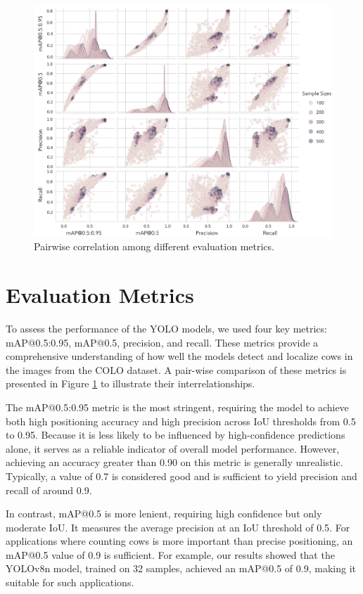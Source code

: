 \begin{figure}[h]
    \centering
    \includegraphics[width=1\textwidth]{figure_s1.jpg}
    \caption{Pairwise correlation among different evaluation metrics.}
    \label{fig:metrics}
\end{figure}


\section{Evaluation Metrics}

To assess the performance of the YOLO models, we used four key metrics: mAP@0.5:0.95, mAP@0.5, precision, and recall. These metrics provide a comprehensive understanding of how well the models detect and localize cows in the images from the COLO dataset. A pair-wise comparison of these metrics is presented in Figure \ref{fig:metrics} to illustrate their interrelationships.

The mAP@0.5:0.95 metric is the most stringent, requiring the model to achieve both high positioning accuracy and high precision across IoU thresholds from 0.5 to 0.95. Because it is less likely to be influenced by high-confidence predictions alone, it serves as a reliable indicator of overall model performance. However, achieving an accuracy greater than 0.90 on this metric is generally unrealistic. Typically, a value of 0.7 is considered good and is sufficient to yield precision and recall of around 0.9.

In contrast, mAP@0.5 is more lenient, requiring high confidence but only moderate IoU. It measures the average precision at an IoU threshold of 0.5. For applications where counting cows is more important than precise positioning, an mAP@0.5 value of 0.9 is sufficient. For example, our results showed that the YOLOv8n model, trained on 32 samples, achieved an mAP@0.5 of 0.9, making it suitable for such applications.

